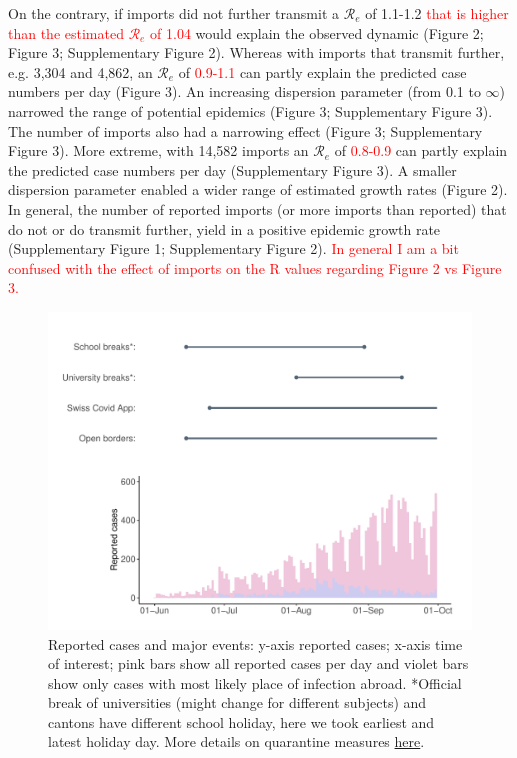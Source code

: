\documentclass[10pt, a4paper, twoside]{article}
\begin{document}
\begin{multicols}{2}
On the contrary, if imports did not further transmit a $\mathcal{R}_e$ of 1.1-1.2 \textcolor{red}{that is higher than the estimated $\mathcal{R}_e$ of 1.04} would explain the observed dynamic (Figure 2; Figure 3; Supplementary Figure 2). 
Whereas with imports that transmit further, e.g. 3,304 and 4,862, an $\mathcal{R}_e$ of \textcolor{red}{0.9-1.1} can partly explain the predicted case numbers per day (Figure 3). 
An increasing dispersion parameter (from 0.1 to $\infty$) narrowed the range of potential epidemics (Figure 3; Supplementary Figure 3).
The number of imports also had a narrowing effect (Figure 3; Supplementary Figure 3).
More extreme, with 14,582 imports an $\mathcal{R}_e$ of \textcolor{red}{0.8-0.9} can partly explain the predicted case numbers per day (Supplementary Figure 3). 
A smaller dispersion parameter enabled a wider range of estimated growth rates (Figure 2). 
In general, the number of reported imports (or more imports than reported) that do not or do transmit further, yield in a positive epidemic growth rate (Supplementary Figure 1; Supplementary Figure 2).
\textcolor{red}{In general I am a bit confused with the effect of imports on the R values regarding Figure 2 vs Figure 3.}

\end{multicols}
\begin{figure}[h]
\centering
\includegraphics[scale=0.5]{regulation_cases_reported_2021-03-05.pdf}
\caption{Reported cases and major events: y-axis reported cases; x-axis time of interest; pink bars show all reported cases per day and violet bars show only cases with most likely place of infection abroad. *Official break of universities (might change for different subjects) and cantons have different school holiday, here we took earliest and latest holiday day. More details on quarantine measures  \href{https://www.fedlex.admin.ch/eli/cc/2021/61/de}{here}.}
\end{figure}
\end{document}
